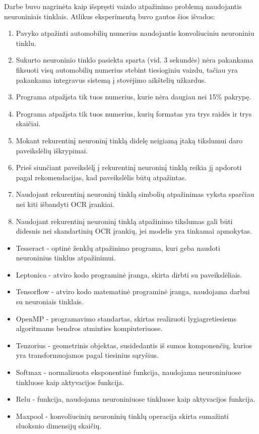 \documentclass{VUMIFInfBakalaurinis}
\begin{document}
Darbe buvo nagrinėta kaip išspręsti vaizdo atpažinimo problemą naudojantis neuroniniais tinklais.
Atlikus eksperimentą buvo gautos šios išvados:
\begin{enumerate}[itemsep=0.5pt]
  \item Pavyko atpažinti automobilių numerius naudojantis konvoliuciniu neuroniniu tinklu.
  \item Sukurto neuroninio tinklo pasiekta sparta (vid. 3 sekundės) nėra pakankama fiksuoti visų automobilių numerius stebint tiesioginiu vaizdu, tačiau yra pakankama integravus sistemą į stovėjimo aikštelių užkardus.
  \item Programa atpažįsta tik tuos numerius, kurie nėra daugiau nei 15\% pakrypę.
  \item Programa atpažįsta tik tuos numerius, kurių formatas yra trys raidės ir trys skaičiai.
  \item Mokant rekurentinį neuroninį tinklą didelę neigiamą įtaką tikslumui daro paveikslėlių iškrypimai.
  \item Prieš siunčiant paveikslėlį į rekurentinį neuroninį tinklą reikia jį apdoroti pagal rekomendacijas, kad paveikslėlis būtų atpažintas.
  \item Naudojant rekurentinį neuroninį tinklą simbolių atpažinimas vyksta sparčiau nei kiti išbandyti OCR įrankiai.
  \item Naudojant rekurentinį neuroninį tinklą atpažinimo tikslumas gali būti didesnis nei skandartinių OCR įrankių, jei modelis yra tinkamai apmokytas.
\end{enumerate}
\pagebreak
\printbibliography[heading=bibintoc]

\pagebreak
{}
\begin{itemize}[itemsep=0.5pt]
  \item Tesseract - optinė ženklų atpažinimo programa, kuri geba naudoti neuroninius tinklus atpažinimui.
  \item Leptonica - atviro kodo programinė įranga, skirta dirbti su paveikslėliais.
  \item Tensorflow - atviro kodo matematinė programinė įranga, naudojama darbui su neuroniais tinklais.
  \item OpenMP - programavimo standartas, skirtas realizuoti lygiagretiesiems algoritmams bendros atminties kompiuteriuose.
  \item Tenzorius - geometrinis objektas, susidedantis iš sumos komponenčių, kurios yra transformuojamos pagal tiesinius sąryšius.
  \item Softmax - normalizuota eksponentinė funkcija, naudojama neuroniniuose tinkluose kaip aktyvacijos funkcija.
  \item Relu - funkcija, naudojama neuroniniuose tinkluose kaip aktyvacijos funkcija.
  \item Maxpool - konvoliucinių neuroninių tinklų operacija skirta sumažinti sluoksnio dimensijų skaičių.
\end{itemize}
\end{document}

